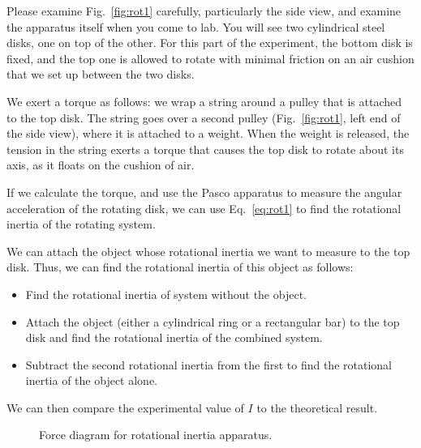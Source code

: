 Please examine Fig.~\ref{fig:rot1} carefully, particularly the side
view, and examine the apparatus itself when you come to lab.  You will
see two cylindrical steel disks, one on top of the other.  For this
part of the experiment, the bottom disk is fixed, and the top one is
allowed to rotate with minimal friction on an air cushion that we
set up between the two disks.

We exert a torque as follows:  we wrap a string around a pulley that
is attached to the top disk.  The string goes over a second pulley
(Fig.~\ref{fig:rot1}, left end of the side view), where it is attached to a weight.  When
the weight is released, the tension in the string exerts a torque 
that
causes the top disk to rotate about its axis, as it floats on the
cushion of air.

If we calculate the torque, and use the Pasco apparatus to measure the
angular acceleration of the rotating disk, we can use
Eq.~\ref{eq:rot1} to find the rotational inertia of the rotating
system.


We can attach the object whose rotational inertia we want to measure
to the top disk.  Thus, we can find the rotational inertia of
this object as follows:
\begin{itemize}
\item Find the rotational inertia of system without the object.
%
\item Attach the object (either a cylindrical ring or a
rectangular bar) to the top disk and find the rotational inertia of
the combined system.
%
\item Subtract the second rotational inertia from the first to find
the rotational inertia of the object alone.
\end{itemize}
We can then compare the experimental value of $I$ to the theoretical
result.

\begin{figure}[!hbt]     
\begin{center}
{}
\end{center}
\caption{Force diagram for rotational inertia apparatus.
          \label{fig:freebody}}
\end{figure}
%
